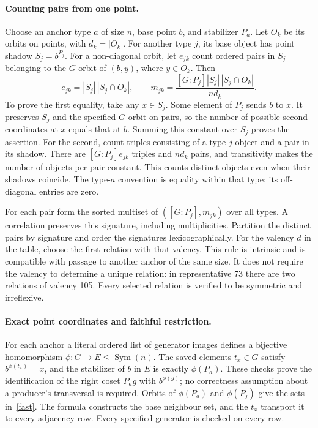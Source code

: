 \documentclass[11pt]{article}
\begin{document}
\paragraph{Counting pairs from one point.}
Choose an anchor type $a$ of size $n$, base point $b$, and stabilizer $P_a$.
Let $O_k$ be its orbits on points, with $d_k=|O_k|$. For another type $j$,
its base object has point shadow $S_j=b^{P_j}$. For a non-diagonal orbit,
let $e_{jk}$ count ordered pairs in $S_j$ belonging to the $G$-orbit of
$(b,y)$, where $y\in O_k$. Then
\begin{equation}\label{fast}
 e_{jk}=|S_j|\,|S_j\cap O_k|,\qquad
 m_{jk}=\frac{[G:P_j]|S_j|\,|S_j\cap O_k|}{n d_k}.
\end{equation}
To prove the first equality, take any $x\in S_j$. Some element of $P_j$
sends $b$ to $x$. It preserves $S_j$ and the specified $G$-orbit on pairs,
so the number of possible second coordinates at $x$ equals that at $b$.
Summing this constant over $S_j$ proves the assertion. For the second,
count triples consisting of a type-$j$ object and a pair in its shadow.
There are $[G:P_j]e_{jk}$ triples and $nd_k$ pairs, and transitivity makes
the number of objects per pair constant. This counts distinct objects even
when their shadows coincide. The type-$a$ convention is equality within
that type; its off-diagonal entries are zero.

For each pair form the sorted multiset of $([G:P_j],m_{jk})$ over all types.
A correlation preserves this signature, including multiplicities. Partition
the distinct pairs by signature and order the signatures lexicographically.
For the valency $d$ in the table, choose the first relation with that valency.
This rule is intrinsic and is compatible with passage to another anchor of
the same size. It does not require the valency to determine a unique relation:
in representative 73 there are two relations of valency 105. Every selected
relation is verified to be symmetric and irreflexive.

\paragraph{Exact point coordinates and faithful restriction.}
For each anchor a literal ordered list of generator images defines a
bijective homomorphism $\phi:G\longrightarrow E\leq\operatorname{Sym}(n)$.
The saved elements $t_x\in G$ satisfy $b^{\phi(t_x)}=x$, and the stabilizer
of $b$ in $E$ is exactly $\phi(P_a)$. These checks prove the identification
of the right coset $P_ag$ with $b^{\phi(g)}$; no correctness assumption
about a producer's transversal is required. Orbits of $\phi(P_a)$ and
$\phi(P_j)$ give the sets in~\eqref{fast}. The formula constructs the base
neighbour set, and the $t_x$ transport it to every adjacency row. Every
specified generator is checked on every row.
\end{document}

